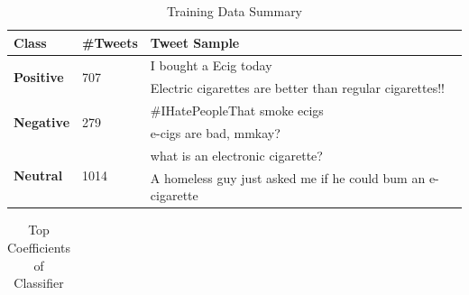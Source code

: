 \documentclass{sig-alternate}
\begin{document}
\begin{table}[ht!]
\centering
\caption{Training Data Summary\label{tab:labelsample}}
\begin{tabular}{|l|l|p{9cm}|}
\hline
{\bf Class}                     & {\bf \#Tweets}        & {\bf Tweet Sample}                                                                                                                       \\ \hline
\multirow{2}{*}{{\bf Positive}} & \multirow{2}{*}{707}  & I bought a Ecig today                                                                                                                    \\ %
                                &                       & Electric cigarettes are better than regular cigarettes!!                                          \\ \hline
\multirow{2}{*}{{\bf Negative}} & \multirow{2}{*}{279}  & \#IHatePeopleThat smoke ecigs                                                  \\ %
                                &                       & e-cigs are bad, mmkay?                                                                                                         \\ \hline
\multirow{2}{*}{{\bf Neutral}}  & \multirow{2}{*}{1014} &  what is an electronic cigarette?        \\ %
                                &                       & A homeless guy just asked me if he could bum an e-cigarette\\ \hline
\end{tabular}
\end{table}
\begin{table}[ht!]
\centering
\caption{Top Coefficients of Classifier\label{t.coef}}
\begin{tabular}{|r|p{14cm}| }
\hline

\end{tabular}
\end{table}
\end{document}
